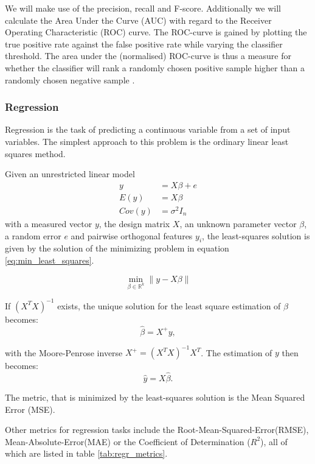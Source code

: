 We will make use of the precision, recall and F-score.
Additionally we will calculate the Area Under the Curve (AUC) with regard to the Receiver Operating Characteristic (ROC) curve.
The ROC-curve is gained by plotting the true positive rate against the false positive rate while varying the classifier threshold.
The area under the (normalised) ROC-curve is thus a measure for whether the classifier will
rank a randomly chosen positive sample higher than a randomly chosen negative sample \cite{FAWCETT2006861}.

\subsubsection{Regression}
Regression is the task of predicting a continuous variable
from a set of input variables.
The simplest approach
to this problem is the ordinary linear least squares method.

Given an unrestricted linear model
\begin{align}
	y &= X\beta + e \\
	E(y) &= X\beta \\
	Cov(y) &= \sigma^2 I_n
\end{align}
with a measured vector $y$, the design matrix $X$,
an unknown parameter vector $\beta$, a random error $e$
and pairwise orthogonal features $y_i$,
the least-squares solution is given by the solution of
the minimizing problem in equation \ref{eq:min_least_squares}.

\begin{equation}
	\min_{\beta\in\mathbb{R}^k} \lVert y - X\beta \rVert
	\label{eq:min_least_squares}
\end{equation}

If $(X^TX)^{-1}$ exists, the unique solution for the
least square estimation of $\beta$ becomes:
\begin{equation}
	\hat{\beta} = X^+ y,
\end{equation}

with the Moore-Penrose inverse $X^+ = (X^TX)^{-1}X^T$.
The estimation of $y$ then becomes:
\begin{equation}
  \hat{y} = X\hat{\beta}.
\end{equation}

The metric, that is minimized by the least-squares solution
is the Mean Squared Error (MSE).

Other metrics for regression tasks include the
Root-Mean-Squared-Error(RMSE),
Mean-Absolute-Error(MAE)
or the Coefficient of Determination ($R^2$), all of which are listed in table
\ref{tab:regr_metrics}.

